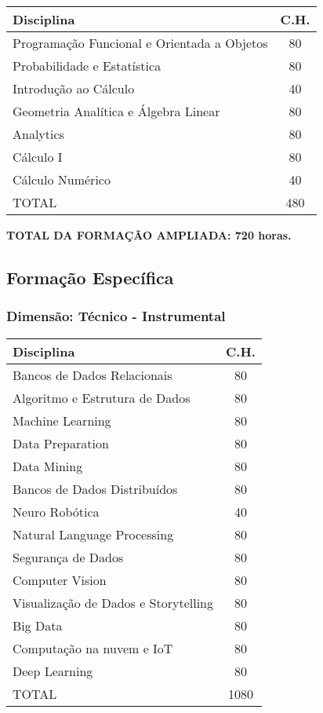\documentclass[a4paper, 12pt, openright, oneside, german, french, english, brazil]{abntex2}
\begin{document}
\begin{table}[!h]
  \footnotesize
  \centering
  \begin{tabular}{|p{9cm}|c|}
    \hline
    \textbf{Disciplina} & \textbf{C.H.} \\
    \hline
    Programação Funcional e Orientada a Objetos & 80 \\
    \hline
    Probabilidade e Estatística & 80 \\
    \hline
    Introdução ao Cálculo & 40 \\
    \hline
    Geometria Analítica e Álgebra Linear & 80 \\
    \hline
    Analytics & 80 \\
    \hline
    Cálculo I & 80 \\
    \hline
    Cálculo Numérico & 40 \\
    \hline
    TOTAL & 480 \\
    \hline
  \end{tabular}
\end{table}

\textbf{TOTAL DA FORMAÇÃO AMPLIADA: 720 horas.}

\subsection{Formação Específica}

\subsubsection{Dimensão: Técnico - Instrumental}

\begin{table}[!h]
  \footnotesize
  \centering
  \begin{tabular}{|p{8cm}|c|}
    \hline
    \textbf{Disciplina} & \textbf{C.H.} \\
    \hline
    Bancos de Dados Relacionais & 80 \\
    \hline
    Algoritmo e Estrutura de Dados & 80 \\
    \hline
    Machine Learning & 80 \\
    \hline
    Data Preparation & 80 \\
    \hline
    Data Mining & 80 \\
    \hline
    Bancos de Dados Distribuídos & 80 \\
    \hline
    Neuro Robótica & 40 \\
    \hline
    Natural Language Processing & 80 \\
    \hline
    Segurança de Dados & 80 \\
    \hline
    Computer Vision & 80 \\
    \hline
    Visualização de Dados e Storytelling & 80 \\
    \hline
    Big Data & 80 \\
    \hline
    Computação na nuvem e IoT & 80 \\
    \hline
    Deep Learning & 80 \\
    \hline
    TOTAL & 1080 \\
    \hline
  \end{tabular}
\end{table}
\end{document}
